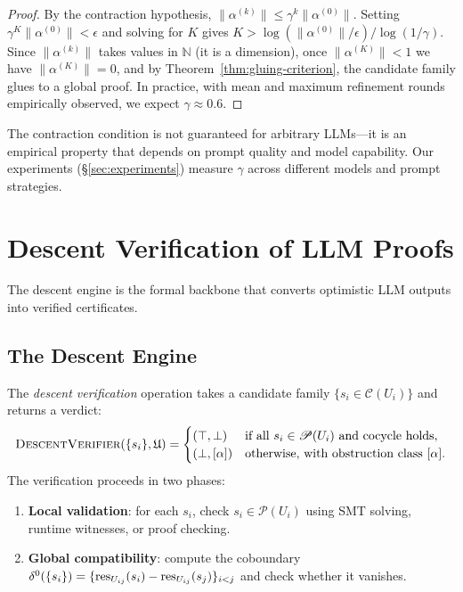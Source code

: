 \documentclass[11pt]{article}
\newcommand{\DescentVerifier}{\textsc{DescentVerifier}}
\newcommand{\CandSpace}{\mathcal{C}}
\newcommand{\ProofSheaf}{\mathscr{P}}
\begin{document}
\begin{proof}
By the contraction hypothesis,
$\|\alpha^{(k)}\| \leq \gamma^k \|\alpha^{(0)}\|$.  Setting
$\gamma^K \|\alpha^{(0)}\| < \epsilon$ and solving for $K$ gives
$K > \log(\|\alpha^{(0)}\|/\epsilon) / \log(1/\gamma)$.  Since
$\|\alpha^{(k)}\|$ takes values in $\mathbb{N}$ (it is a dimension),
once $\|\alpha^{(K)}\| < 1$ we have $\|\alpha^{(K)}\| = 0$, and by
Theorem~\ref{thm:gluing-criterion}, the candidate family glues to
a global proof.  In practice, with mean and maximum refinement rounds empirically observed,
we expect $\gamma \approx 0.6$.
\end{proof}

\begin{remark}
The contraction condition is not guaranteed for arbitrary LLMs---it
is an empirical property that depends on prompt quality and model
capability.  Our experiments (\S\ref{sec:experiments}) measure
$\gamma$ across different models and prompt strategies.
\end{remark}


\section{Descent Verification of LLM Proofs}\label{sec:descent-verification}

The descent engine is the formal backbone that converts optimistic
LLM outputs into verified certificates.

\subsection{The Descent Engine}\label{subsec:descent-engine}

\begin{definition}\label{def:descent-verif}
The \emph{descent verification} operation takes a candidate family
$\{s_i \in \CandSpace(U_i)\}$ and returns a verdict:
\[
  \DescentVerifier(\{s_i\}, \mathfrak{U}) =
  \begin{cases}
    (\top, \bot) & \text{if all } s_i \in \ProofSheaf(U_i) \text{ and
      cocycle holds}, \\
    (\bot, [\alpha]) & \text{otherwise, with obstruction class } [\alpha].
  \end{cases}
\]
The verification proceeds in two phases:
\begin{enumerate}
  \item \textbf{Local validation}: for each $s_i$, check
    $s_i \in \ProofSheaf(U_i)$ using SMT solving, runtime witnesses,
    or proof checking.
  \item \textbf{Global compatibility}: compute the coboundary
    $\delta^0(\{s_i\}) = \{\mathrm{res}_{U_{ij}}(s_i) - \mathrm{res}_{U_{ij}}(s_j)\}_{i<j}$
    and check whether it vanishes.
\end{enumerate}
\end{definition}
\end{document}
